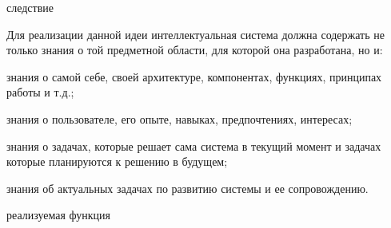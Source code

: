 \begin{SCn}
\begin{scnindent}
\begin{scnindent}
\begin{scnindent}
\begin{scnrelfromlistcustom}{следствие}
				\end{scnrelfromlistcustom}
				{Для реализации данной идеи интеллектуальная система должна содержать не только знания о той предметной области, для которой она разработана, но и:
				\begin{scnitemize}
					\item знания о самой себе, своей архитектуре, компонентах, функциях, принципах работы и т.д.;
					\item знания о пользователе, его опыте, навыках, предпочтениях, интересах;
					\item знания о задачах, которые решает сама система в текущий момент и задачах которые планируются к решению в будущем;
					\item знания об актуальных задачах по развитию системы и ее сопровождению. 
				\end{scnitemize}
			}
			\begin{scnindent}
			\end{scnindent}
			\begin{scnrelfromlistcustom}{реализуемая функция}
			\end{scnrelfromlistcustom}
		\end{scnindent}
	\end{scnindent}
	\end{scnindent}
\end{SCn}

